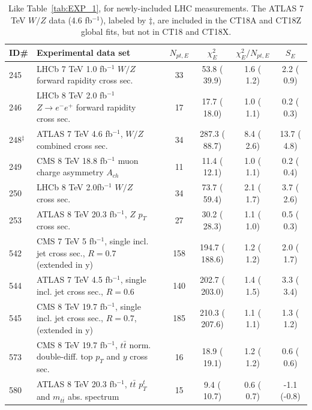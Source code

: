 \begin{table}[tb]
\begin{tabular}{|l|lr|c|c|c|c|}
\hline
\textbf{ID\# }  & \textbf{Experimental data set} &  & $N_{pt, E}$  & $\chi^2_E$ & $\chi^{2}_E/N_{pt, E}$  & $S_E$ \tabularnewline
\hline
\hline
 245 & LHCb 7 TeV 1.0 fb$^{-1}$ $W/Z$ forward rapidity cross sec.                          & \cite{Aaij:2015gna}        &  33  &   53.8 (  39.9) &  1.6 (  1.2) &  2.2 ( 0.9) \tabularnewline\hline
 246 & LHCb 8 TeV  2.0 fb$^{-1}$ $Z\rightarrow e^{-} e^{+}$ forward rapidity cross sec.    & \cite{Aaij:2015vua}        &  17  &   17.7 (  18.0) &  1.0 (  1.1) &  0.2 ( 0.3) \tabularnewline\hline
 248$^{\ddagger}$ & ATLAS 7 TeV 4.6 fb$^{-1}$, $W/Z$ combined cross sec.                   & \cite{Aaboud:2016btc}      &  34  &  287.3 (  88.7) &  8.4 (  2.6) & 13.7 ( 4.8) \tabularnewline\hline
 249 & CMS 8 TeV 18.8 fb$^{-1}$ muon charge asymmetry $A_{ch}$                                & \cite{Khachatryan:2016pev} &  11  &   11.4 (  12.1) &  1.0 (  1.1) &  0.2 ( 0.4) \tabularnewline\hline
 250 & LHCb 8 TeV 2.0fb$^{-1}$ $W/Z$ cross sec.                                            & \cite{Aaij:2015zlq}        &  34  &   73.7 (  59.4) &  2.1 (  1.7) &  3.7 ( 2.6) \tabularnewline\hline 
 253 & ATLAS 8 TeV 20.3 fb$^{-1}$, $Z$ $p_T$ cross sec.                                    & \cite{Aad:2015auj}         &  27  &   30.2 (  28.3) &  1.1 (  1.0) &  0.5 ( 0.3) \tabularnewline\hline
 542 & CMS 7 TeV 5 fb$^{-1}$, single incl. jet cross sec., $R=0.7$ (extended in y)         & \cite{Chatrchyan:2014gia}  & 158  &  194.7 ( 188.6) &  1.2 (  1.2) &  2.0 ( 1.7) \tabularnewline\hline
 544 & ATLAS 7 TeV  4.5 fb$^{-1}$, single incl. jet cross sec., $R=0.6$                    & \cite{Aad:2014vwa}         & 140  &  202.7 ( 203.0) &  1.4 (  1.5) &  3.3 ( 3.4) \tabularnewline\hline
 545 & CMS 8 TeV 19.7 fb$^{-1}$, single incl. jet cross sec., $R=0.7$, (extended in y)     & \cite{Khachatryan:2016mlc} & 185  &  210.3 ( 207.6) &  1.1 (  1.1) &  1.3 ( 1.2) \tabularnewline\hline
 573 & CMS 8 TeV 19.7 fb$^{-1}$, $t\bar{t}$ norm. double-diff. top $p_T$ and $y$ cross sec. & \cite{Sirunyan:2017azo}    &  16  &   18.9 (  19.1) &  1.2 (  1.2) &  0.6 ( 0.6) \tabularnewline\hline
 580 & ATLAS 8 TeV 20.3 fb$^{-1}$, $t\bar{t}$ $p_{T}^{t}$ and $m_{t\bar{t}}$ abs. spectrum    & \cite{Aad:2015mbv}         &  15  &    9.4 (  10.7) &  0.6 (  0.7) & -1.1 (-0.8) \tabularnewline
 \hline
\end{tabular}
\caption{Like Table~\ref{tab:EXP_1}, for newly-included LHC measurements.
	The ATLAS 7 TeV $W/Z$ data (4.6 fb$^{-1}$), labeled by $\ddagger$, are included in the CT18A and CT18Z global fits, but not in CT18 and CT18X. 
\label{tab:EXP_2} }
\end{table}
\endgroup




